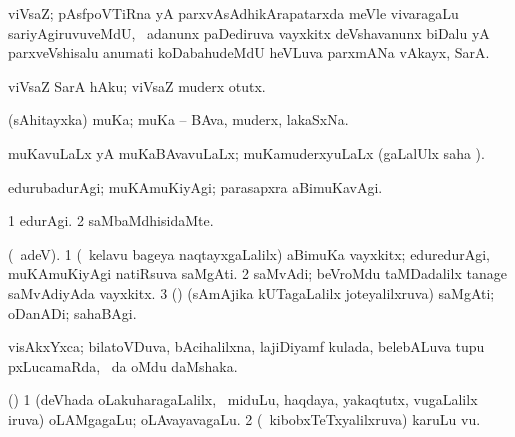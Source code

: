 \bentry
{}
\gl{\saMkiSx}
\expl{}
\bmng
{} 
\emng
\eentry

\bentry
{} 
\gl{\nA}
\expl{}
\bmng
 viVsaZ; pAsfpoVTiRna yA parxvAsAdhikArapatarxda meVle vivaragaLu sariyAgiruvuveMdU, \kanmu\ adanunx paDediruva vayxkitx deVshavanunx biDalu yA parxveVshisalu anumati koDabahudeMdU heVLuva parxmANa vAkayx, SarA. 
\emng
\eentry

\bentry 
{} 
\gl{\sakirx}
\bmng
 viVsaZ SarA hAku; viVsaZ muderx otutx. 
\emng
\eentry

\bentry
{} 
\gl{\nA}
\expl{}
\bmng
 (sAhitayxka) muKa; muKa -- BAva, muderx, lakaSxNa. 
\emng
\eentry

\bentry 
{} 
\gl{\gu}
\expl{}
\bmng
muKavuLaLx yA muKaBAvavuLaLx; muKamuderxyuLaLx (\saMpa gaLalUlx saha \parx). 
\emng
\eentry

\bentry 
{} 
\gl{\kirxvi}
\expl{\F}
\bmng
edurubadurAgi; muKAmuKiyAgi; parasapxra aBimuKavAgi. 
\emng
\eentry

\bentry 
{} 
\gl{\upa}
\expl{\F\ }
\bmng
\bnum
\num{1} edurAgi. 
\num{2} saMbaMdhisidaMte. 
\enum
\emng
\eentry

\bentry 
{} 
\gl{\nA}
\expl{\F}
\bmng
(\bava\ adeV). 
\bnum
\num{1} (\kanmu\ kelavu bageya naqtayxgaLalilx) aBimuKa vayxkitx; eduredurAgi, muKAmuKiyAgi natiRsuva saMgAti. 
\num{2} saMvAdi; beVroMdu taMDadalilx tanage saMvAdiyAda vayxkitx. 
\num{3} (\ame) (sAmAjika kUTagaLalilx joteyalilxruva) saMgAti; oDanADi; sahaBAgi. 
\enum
\emng
\eentry

\bentry 
{} 
\pron{}
\gl{\saMkiSx}
\expl{}
\bmng
{} 
\emng
\eentry

\bentry
{} 
\gl{\nA}
\expl{}
\bmng
 visAkxYxca; bilatoVDuva, bAcihalilxna, lajiDiyamf kulada, belebALuva tupu pxLucamaRda, \da\ \ame da oMdu daMshaka. 
\emng
\eentry

\bentry 
{} 
\gl{\nA}
\expl{}
\bmng
 (\bava) 
\bnum
\num{1} (deVhada oLakuharagaLalilx, \udA\ miduLu, haqdaya, yakaqtutx, \mo vugaLalilx iruva) oLAMgagaLu; oLAvayavagaLu. 
\num{2} (\kanmu\ kibobxTeTxyalilxruva) karuLu \mo vu. 
\enum
\emng
\eentry

